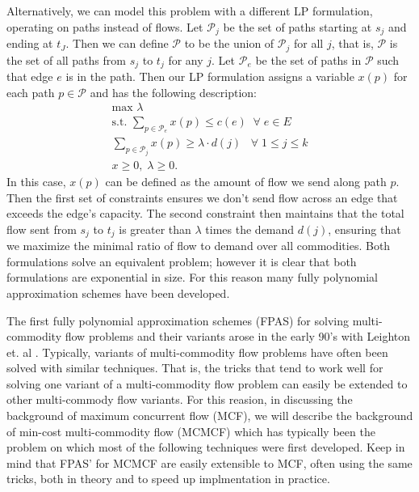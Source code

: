 Alternatively, we can model this problem with a
different LP formulation, operating on paths instead of flows. Let
$\mathcal{P}_j$ be the set of paths starting at $s_j$ and ending at
$t_J$.
Then we can define $\mathcal{P}$ to be the union of $\mathcal{P}_j$
for all $j$, that is, $\mathcal{P}$ is the set of all paths from $s_j$
to $t_j$ for any $j$. Let $\mathcal{P}_e$ be the set of paths in
$\mathcal{P}$ such that edge $e$ is in the path. Then our LP
formulation assigns a variable $x(p)$ for each path $p\in \mathcal{P}$
and has the following description:
\begin{align*}
\text{max     } \lambda \\
\text{s.t. }\sum_{p\in \mathcal{P}_e}x(p) \leq c(e) \;\;\forall\;
e\in E \\
\sum_{p\in \mathcal{P}_j} x(p)\geq \lambda\cdot d(j) \;\;\;\forall \;1\leq j\leq k \\
x\geq 0,\; \lambda\geq 0.
\end{align*}
In this case, $x(p)$ can be defined as the amount of flow we send
along path $p$. Then the first set of constraints ensures we don't
send flow across an edge that exceeds the edge's capacity. The second
constraint then maintains that the total flow sent from $s_j$ to $t_j$
is greater than $\lambda$ times the demand $d(j)$, ensuring that we
maximize the minimal ratio of flow to demand over all commodities. Both formulations solve an equivalent problem; however
it is clear that both formulations are exponential in size. For this
reason many fully polynomial approximation schemes have been
developed. 

The first fully polynomial approximation schemes (FPAS) for solving
multi-commodity flow problems and their variants arose in the early
90's with Leighton et. al \cite{leighton}.
Typically, variants of multi-commodity flow problems have often been
solved with similar techniques. That is, the tricks that tend to work
well for solving one variant of a multi-commodity flow problem can
easily be extended to other multi-commody flow variants. For this
reasion, in discussing the background of maximum concurrent flow (MCF),
we will describe the background of min-cost multi-commodity flow
(MCMCF) which has typically been the problem on which most of the
following techniques were first developed. Keep in mind that FPAS'
for MCMCF are easily extensible to MCF, often using the same tricks,
both in theory and to speed up implmentation in
practice.

